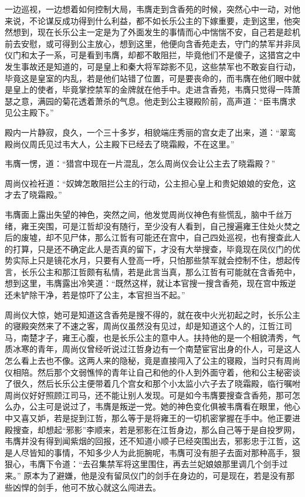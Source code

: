 一边巡视，一边想着如何控制大局，韦膺走到含香苑的时候，突然心中一动，对他来说，不论谋反成功得到什么利益，都不如长乐公主的下嫁重要，走到这里，他突然想到，现在长乐公主一定是为了外面发生的事情而心中惴惴不安，自己若是趁机前去安慰，或可得到公主放心，想到这里，他便向含香苑走去，守门的禁军并非凤仪门和太子一系，可是看到韦膺，却都不敢阻拦，毕竟他们不是傻子，这猎宫之中发生事故还是知道的，可是皇上和秦大将军踪影不见，这些禁军也不敢妄自行动，毕竟这是皇室的内乱，若是他们站错了位置，可是要丧命的，而韦膺在他们眼中就是皇上的使者，毕竟掌控禁军的金牌就在他手中。走进含香苑，韦膺只觉得一阵萧瑟之意，满园的菊花透着萧杀的气息。他走到公主寝殿阶前，高声道：“臣韦膺求见公主殿下。”

殿内一片静寂，良久，一个三十多岁，相貌端庄秀丽的宫女走了出来，道：“翠鸾殿尚仪周氏见过韦大人，公主殿下已经去了晓霜殿，不在这里。”

韦膺一愣，道：“猎宫中现在一片混乱，怎么周尚仪会让公主去了晓霜殿？”

周尚仪裣衽道：“奴婢怎敢阻拦公主的行动，公主担心皇上和贵妃娘娘的安危，这才去了晓霜殿。”

韦膺面上露出失望的神色，突然之间，他发觉周尚仪神色有些慌乱，脑中千丝万绪，雍王突围，可是江哲却没有随行，至少没有人看到，自己搜遍雍王住处火焚之后的废墟，却不见尸体，那么江哲有可能还在宫中，自己四处巡视，也有搜查此人的打算，只是还不确定此人是否真的留下，才没有大举搜查，毕竟现在凤仪门的优势实际上只是镜花水月，只要有人登高一呼，只怕那些禁军就会控制不住，想起传言，长乐公主和那江哲颇有私情，若是此言当真，那么江哲有可能就在含香苑中，想到这里，韦膺露出冷笑道：“既然这样，就让本官搜一搜含香苑，现在宫中叛逆还未铲除干净，若是惊吓了公主，本官担当不起。”

周尚仪大惊，她可是知道这含香苑是搜不得的，就在夜中火光初起之时，长乐公主的寝殿突然来了不速之客，周尚仪虽然没有见过，却是知道这个人的，江哲江司马，南楚才子，雍王心腹，也是长乐公主的意中人。扶持他的是一个相貌清秀，气质冰寒的青年，周尚仪曾经听说过江哲身边有一个南楚宦官出身的仆人，可是这人怎么看上去也不像。这两人来的隐秘，竟是直接闯入了公主的寝殿，当时只有周尚仪相陪。然后那个文弱憔悴的青年让自己和他的仆人到外面守着，他和公主秘密谈了很久，然后长乐公主便带着几个宫女和那个小太监小六子去了晓霜殿，临行嘱咐周尚仪好好照顾江司马，还不能让别人发现。可是如今韦膺要搜查含香苑，那可怎么办，公主可是说过了，韦膺是叛逆一党。她的神色变化俱被韦膺看在眼里，他心中又喜又妒，若是捉到江哲，那么等于是将雍王的一切机密掌握在手中。他正要进殿搜查，却想起“邪影”李顺来，若是邪影在江哲身边，那么自己等于是自投罗网，韦膺并没有得到闻紫烟的回报，还不知道小顺子已经突围出去，邪影忠于江哲，这是人尽皆知的事情，不知多少人为此扼腕呢，韦膺可没有胆子去面对那种高手，狠狠心，韦膺下令道：“去召集禁军将这里围住，再去兰妃娘娘那里调几个剑手过来。” 原本为了避嫌，他是没有留凤仪门的剑手在身边的，可是现在，若是没有那些凶悍的剑手，他可不放心就这么闯进去。

